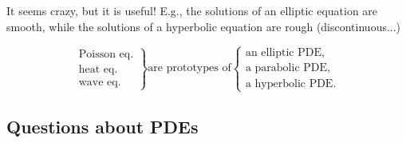 \documentclass[12pt]{article}
\theoremstyle{definition}
\begin{document}
It seems crazy, but it is useful! E.g., the solutions of an elliptic equation are smooth, while the solutions of a hyperbolic equation are rough (discontinuous...)

\[\left.\begin{array}{r}\text{Poisson eq.}\\\text{heat eq.}\\\text{wave eq.}\end{array}\right\}\text{are prototypes of}\left\{\begin{array}{l}\text{an elliptic PDE},\\\text{a parabolic PDE,}\\\text{a hyperbolic PDE.}\end{array}\right.\]

\subsection*{Questions about PDEs}
\end{document}
